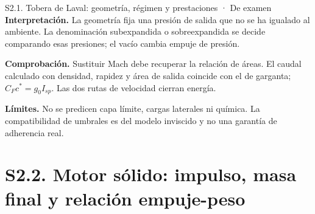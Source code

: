 \begin{studiumworked}{S2.1. Tobera de Laval: geometría, régimen y prestaciones · De examen}
\textbf{Interpretación.} La geometría fija una presión de salida que no se ha igualado al ambiente. La denominación subexpandida o sobreexpandida se decide comparando esas presiones; el vacío cambia empuje de presión.

\textbf{Comprobación.} Sustituir Mach debe recuperar la relación de áreas. El caudal calculado con densidad, rapidez y área de salida coincide con el de garganta; $C_Fc^*=g_0I_{sp}$. Las dos rutas de velocidad cierran energía.

\textbf{Límites.} No se predicen capa límite, cargas laterales ni química. La compatibilidad de umbrales es del modelo inviscido y no una garantía de adherencia real.
\end{studiumworked}
\section{S2.2. Motor sólido: impulso, masa final y relación empuje-peso}

